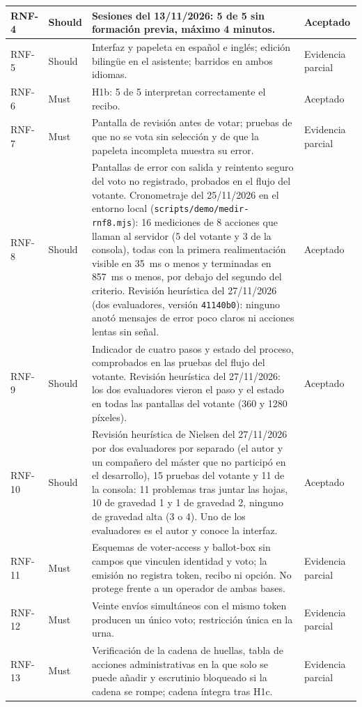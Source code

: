 \begin{longtable}{|>{\raggedright\arraybackslash}p{}|>{\raggedright\arraybackslash}p{}|>{\raggedright\arraybackslash}p{}|>{\raggedright\arraybackslash}p{}|}
\hline
RNF-4 & Should & Sesiones del 13/11/2026: 5 de 5 sin formación previa, máximo 4 minutos. & Aceptado \\
\hline
RNF-5 & Should & Interfaz y papeleta en español e inglés; edición bilingüe en el asistente; barridos en ambos idiomas. & Evidencia parcial \\
\hline
RNF-6 & Must & H1b: 5 de 5 interpretan correctamente el recibo. & Aceptado \\
\hline
RNF-7 & Must & Pantalla de revisión antes de votar; pruebas de que no se vota sin selección y de que la papeleta incompleta muestra su error. & Evidencia parcial \\
\hline
RNF-8 & Should & Pantallas de error con salida y reintento seguro del voto no registrado, probados en el flujo del votante. Cronometraje del 25/11/2026 en el entorno local (\texttt{scripts/demo/medir-rnf8.mjs}): 16 mediciones de 8 acciones que llaman al servidor (5 del votante y 3 de la consola), todas con la primera realimentación visible en 35~ms o menos y terminadas en 857~ms o menos, por debajo del segundo del criterio. Revisión heurística del 27/11/2026 (dos evaluadores, versión \texttt{41140b0}): ninguno anotó mensajes de error poco claros ni acciones lentas sin señal. & Aceptado \\
\hline
RNF-9 & Should & Indicador de cuatro pasos y estado del proceso, comprobados en las pruebas del flujo del votante. Revisión heurística del 27/11/2026: los dos evaluadores vieron el paso y el estado en todas las pantallas del votante (360 y 1280 píxeles). & Aceptado \\
\hline
RNF-10 & Should & Revisión heurística de Nielsen del 27/11/2026 por dos evaluadores por separado (el autor y un compañero del máster que no participó en el desarrollo), 15 pruebas del votante y 11 de la consola: 11 problemas tras juntar las hojas, 10 de gravedad 1 y 1 de gravedad 2, ninguno de gravedad alta (3 o 4). Uno de los evaluadores es el autor y conoce la interfaz. & Aceptado \\
\hline
RNF-11 & Must & Esquemas de voter-access y ballot-box sin campos que vinculen identidad y voto; la emisión no registra token, recibo ni opción. No protege frente a un operador de ambas bases. & Evidencia parcial \\
\hline
RNF-12 & Must & Veinte envíos simultáneos con el mismo token producen un único voto; restricción única en la urna. & Evidencia parcial \\
\hline
RNF-13 & Must & Verificación de la cadena de huellas, tabla de acciones administrativas en la que solo se puede añadir y escrutinio bloqueado si la cadena se rompe; cadena íntegra tras H1c. & Evidencia parcial \\

\end{longtable}
